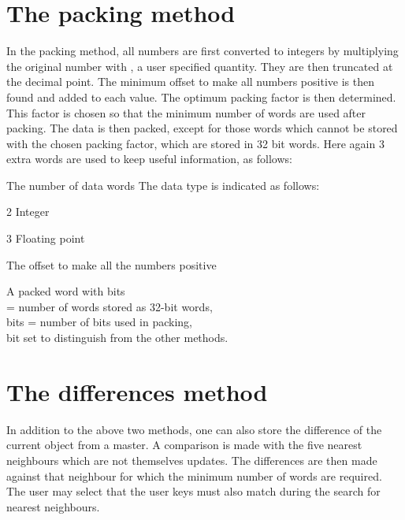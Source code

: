 \section{The packing method}

In the packing method, all numbers are first converted
to integers by multiplying the original number with ,
a user specified quantity.
They are then truncated at the decimal point.
The minimum offset to make all numbers positive is then found and added
to each value.
The optimum packing factor is then determined.
This
factor is chosen so that the minimum number of words are used after packing.
The data is then packed, except for those words which cannot be stored
with the chosen packing factor, which are stored in 32 bit words.
Here again 3 extra words are used to keep useful information, as follows:

\begin{OL}
\item The number of data words 
  The data type is indicated as follows:
  \begin{DLtt}{1}
    \item[2]Integer
    \item[3]Floating point
  \end{DLtt}
\item The offset to make all the numbers positive
\item A packed word with bits \\
   = number of words stored as 32-bit words,\\
  bits  = number of bits used in packing,\\
  bit  set to distinguish from the other methods.
\end{OL}

\section{The differences method}

In addition to the above two methods, one can also store
the difference of the current object from a master.
A comparison is made with the five nearest
neighbours which are not themselves updates. The differences are then made
against that neighbour for which the minimum number of words are required.
The user may select that the user keys must also match during the search
for nearest neighbours.

